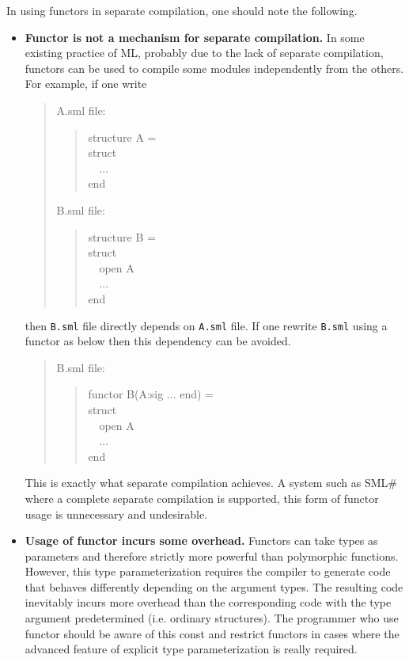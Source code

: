 \documentclass{jbook}
\newcommand{\smlsharp}{SML\#}
\newcommand{\myem}{\mbox{\ \ }}
\newenvironment{program}{\begin{quote}\begin{tt}}%
                        {\end{tt}\end{quote}}
\begin{document}
	In using functors in separate compilation, one should note the
following.
\begin{itemize}
\item {\bf Functor is not a mechanism for separate compilation.}
	In some existing practice of ML, probably due to the lack of
separate compilation, functors can be used to compile some modules
independently from the others.
	For example, if one write
\begin{quote}
\begin{minipage}{0.9\textwidth}
A.sml {\rm file:}
\begin{program}
structure A =\\
struct\\
\myem   ...\\
end
\end{program}
B.sml {\rm file:}
\begin{program}
structure B = \\
struct\\
\myem  open A\\
\myem  ...\\
end
\end{program}
\end{minipage}
\end{quote}
then {\tt B.sml} file directly depends on {\tt A.sml} file.
	If one rewrite {\tt B.sml} using a functor as below then this
dependency can be avoided.
\begin{quote}
\begin{minipage}{0.9\textwidth}
B.sml {\rm file:}
\begin{program}
functor B(A:sig ... end) = \\
struct\\
\myem  open A\\
\myem  ...\\
end
\end{program}
\end{minipage}
\end{quote}	
	This is exactly what separate compilation achieves.
	A system such as \smlsharp{} where a complete separate
compilation is supported, this form of functor usage is unnecessary 
and undesirable.

\item {\bf Usage of functor incurs some overhead.}
	Functors can take types as parameters and therefore strictly
more powerful than polymorphic functions.
	However, this type parameterization requires the compiler to
generate code that behaves differently depending on the argument types. 
	The resulting code  inevitably incurs more overhead than the
corresponding code with the type argument predetermined (i.e. ordinary
structures).
	The programmer who use functor should be aware of this const and
restrict functors in cases where the advanced feature of explicit type
parameterization is really required.
\end{itemize}
\end{document}
